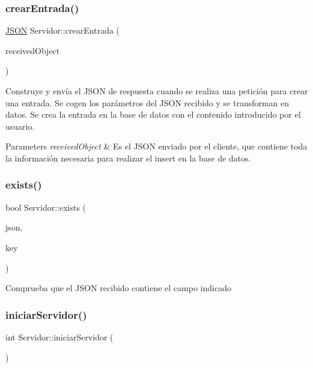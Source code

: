 \subsubsection{\texorpdfstring{crear\+Entrada()}{crearEntrada()}}
{\footnotesize\ttfamily \mbox{\hyperlink{classnlohmann_1_1basic__json}{J\+S\+ON}} Servidor\+::crear\+Entrada (\begin{DoxyParamCaption}\item[{\mbox{\hyperlink{classnlohmann_1_1basic__json}{J\+S\+ON}}}]{received\+Object }\end{DoxyParamCaption})}

Construye y envía el J\+S\+ON de respuesta cuando se realiza una petición para crear una entrada. Se cogen los parámetros del J\+S\+ON recibido y se transforman en datos. Se crea la entrada en la base de datos con el contenido introducido por el usuario. 
\begin{DoxyParams}{Parameters}
{\em received\+Object} & Es el J\+S\+ON enviado por el cliente, que contiene toda la información necesaria para realizar el insert en la base de datos. \\
\hline
\end{DoxyParams}
\mbox{\label{classServidor_a41f9f66959c43b27d1d13cf4f20eca55}} 
\subsubsection{\texorpdfstring{exists()}{exists()}}
{\footnotesize\ttfamily bool Servidor\+::exists (\begin{DoxyParamCaption}\item[{const \mbox{\hyperlink{classnlohmann_1_1basic__json}{J\+S\+ON}} \&}]{json,  }\item[{const std\+::string \&}]{key }\end{DoxyParamCaption})}

Comprueba que el J\+S\+ON recibido contiene el campo indicado \mbox{\label{classServidor_a2a7fdca08064f9e567c579a2cb34f267}} 
\subsubsection{\texorpdfstring{iniciar\+Servidor()}{iniciarServidor()}}
{\footnotesize\ttfamily int Servidor\+::iniciar\+Servidor (\begin{DoxyParamCaption}{ }\end{DoxyParamCaption})}

